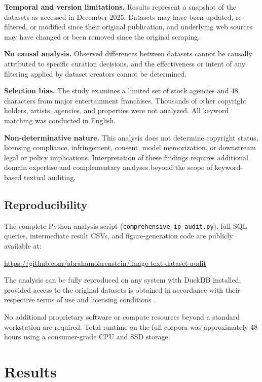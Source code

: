\documentclass[11pt]{article}
\begin{document}
\textbf{Temporal and version limitations.}
Results represent a snapshot of the datasets as accessed in December 2025.
Datasets may have been updated, re-filtered, or modified since their original publication,
and underlying web sources may have changed or been removed since the original scraping.


\textbf{No causal analysis.}
Observed differences between datasets cannot be causally attributed to specific curation decisions, and the effectiveness or intent of any filtering applied by dataset creators cannot be determined.

\textbf{Selection bias.}
The study examines a limited set of stock agencies and 48 characters from major entertainment franchises. Thousands of other copyright holders, artists, agencies, and properties were not analyzed. All keyword matching was conducted in English.

\textbf{Non-determinative nature.}
This analysis does not determine copyright status, licensing compliance, infringement, consent, model memorization, or downstream legal or policy implications. Interpretation of these findings requires additional domain expertise and complementary analyses beyond the scope of keyword-based textual auditing.


\subsection{Reproducibility}
The complete Python analysis script (\texttt{comprehensive\_ip\_audit.py}), full SQL queries, intermediate result CSVs, and figure-generation code are publicly available at:

\begin{center}
\url {https://github.com/abrahamohrenstein/image-text-dataset-audit}
\end{center}

The analysis can be fully reproduced on any system with DuckDB installed, provided access to the original datasets is obtained in accordance with their respective terms of use and licensing conditions \citep{kakaobrain2022coyo, gadre2023datacomp}.

No additional proprietary software or compute resources beyond a standard workstation are required. Total runtime on the full corpora was approximately 48 hours using a consumer-grade CPU and SSD storage.

\section{Results}
\end{document}
